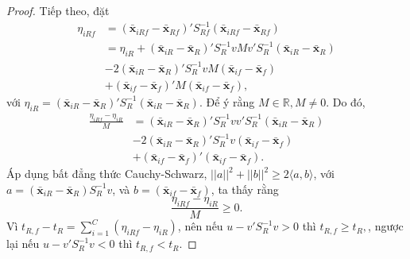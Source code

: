 \begin{proof}
	Tiếp theo, đặt
	\begin{align*}
		\eta_{iRf} &= (\bar{\boldsymbol{x}} _{iRf}-\bar{\boldsymbol{x}}_{Rf})'S_{Rf}^{-1}(\bar{\boldsymbol{x}} _{iRf}-\bar{\boldsymbol{x}}_{Rf})\\
		&= \eta_{iR}+(\bar{\boldsymbol{x}}_{iR}-\bar{\boldsymbol{x}}_R)'S_R^{-1}vMv'S_R^{-1}(\bar{\boldsymbol{x}}_{iR}-\bar{\boldsymbol{x}}_R)\\
		& - 2(\bar{\boldsymbol{x}}_{iR}-\bar{\boldsymbol{x}}_R)'S_R^{-1}vM(\bar{\boldsymbol{x}}_{if}-\bar{\boldsymbol{x}}_f)\\
		&+ (\bar{\boldsymbol{x}}_{if}-\bar{\boldsymbol{x}}_f)'M(\bar{\boldsymbol{x}}_{if}-\bar{\boldsymbol{x}}_f),
	\end{align*}
	với  
	$\eta_{iR} = (\bar{\boldsymbol{x}} _{iR}-\bar{\boldsymbol{x}}_{R})'S_{R}^{-1}(\bar{\boldsymbol{x}} _{iR}-\bar{\boldsymbol{x}}_{R})$. Để ý rằng $ M\in \mathbb{R}, M\neq 0$. Do đó,
	\begin{align*}
		\frac{\eta_{iRf}-\eta_{iR}}{M}     &=
		(\bar{\boldsymbol{x}}_{iR}-\bar{\boldsymbol{x}}_R)'S_R^{-1}vv'S_R^{-1}(\bar{\boldsymbol{x}}_{iR}-\bar{\boldsymbol{x}}_R)\\
		& - 2(\bar{\boldsymbol{x}}_{iR}-\bar{\boldsymbol{x}}_R)'S_R^{-1}v(\bar{\boldsymbol{x}}_{if}-\bar{\boldsymbol{x}}_f)\\
		&+ (\bar{\boldsymbol{x}}_{if}-\bar{\boldsymbol{x}}_f)'(\bar{\boldsymbol{x}}_{if}-\bar{\boldsymbol{x}}_f).
	\end{align*}
	Áp dụng bất đẳng thức Cauchy-Schwarz, $||a||^2+||b||^2\ge 2 \langle a,b\rangle$, với  $a = (\bar{\boldsymbol{x}}_{iR}-\bar{\boldsymbol{x}}_R)S_R^{-1}v$, và $b = (\bar{\boldsymbol{x}}_{if}-\bar{\boldsymbol{x}}_f)$, ta thấy rằng
	\begin{equation*}
		\frac{\eta_{iRf}-\eta_{iR}}{M} \ge 0.
	\end{equation*}
	Vì $
	t_{R,f} - t_{R} = \sum_{i=1}^C (\eta_{iRf}- \eta_{iR})$, nên nếu $u - v'S_R^{-1}v>0$ thì $t_{R,f}\ge t_R,$, ngược lại nếu $u - v'S_R^{-1}v<0$ thì $t_{R,f}< t_R.$
\end{proof}


